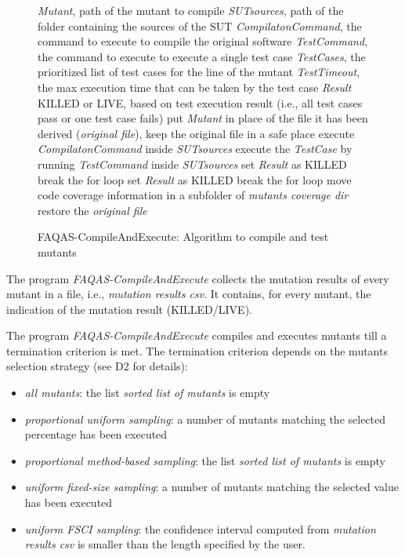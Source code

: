 \begin{figure}[h]
\begin{algorithmic}[1]
\scriptsize
\Require \emph{Mutant}, path of the mutant to compile
\Require \emph{SUTsources}, path of the folder containing the sources of the SUT
\Require \emph{CompilatonCommand}, the command to execute to compile the original software
\Require \emph{TestCommand}, the command to execute to execute a single test case
\Require \emph{TestCases}, the prioritized list of test cases for the line of the mutant
\Require \emph{TestTimeout}, the max execution time that can be taken by the test case
\Ensure \emph{Result} KILLED or LIVE, based on test execution result (i.e., all test cases pass or one test case fails)
\State put \emph{Mutant} in place of the file it has been derived (\emph{original file}), keep the original file in a safe place
\State execute  \emph{CompilatonCommand} inside \emph{SUTsources}
\State execute the \emph{TestCase} by running \emph{TestCommand} inside \emph{SUTsources}
\State set \emph{Result} as KILLED
\State break the for loop
\EndIf
{}
\State set \emph{Result} as KILLED
\State break the for loop
\EndIf
\EndFor
\State move code coverage information in a subfolder of \emph{mutants coverage dir}
\State restore the \emph{original file}
\end{algorithmic}
\caption{FAQAS-CompileAndExecute: Algorithm to compile and test mutants}
\label{alg:compileAndExecute}
\end{figure}

\RQ{} The program \emph{FAQAS-CompileAndExecute} collects the mutation results of every mutant in a file, i.e., \emph{mutation results csv}. It contains, for every mutant, the indication of the mutation result (KILLED/LIVE).

\RQ{} The program \emph{FAQAS-CompileAndExecute} compiles and executes mutants till a termination criterion is met. The termination criterion depends on the mutants selection strategy (see D2 for details):
\begin{itemize}
\item \emph{all mutants}: the list \emph{sorted list of mutants} is empty
\item \emph{proportional uniform sampling}: a number of mutants matching the selected percentage has been executed
\item \emph{proportional method-based sampling}: the list \emph{sorted list of mutants} is empty
\item \emph{uniform fixed-size sampling}: a number of mutants matching the selected value has been executed
\item \emph{uniform FSCI sampling}: the confidence interval computed from \emph{mutation results csv} is smaller than the length specified by the user.
\end{itemize}


